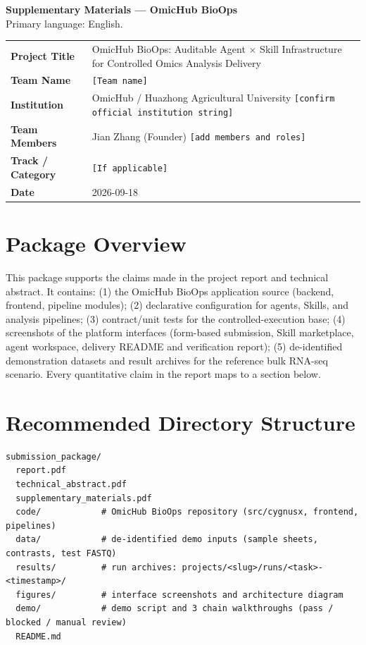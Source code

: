 \documentclass[11pt,a4paper]{article}
\begin{document}
\begin{center}
{\LARGE\bfseries Supplementary Materials --- OmicHub BioOps}\\[0.5em]
{\large Primary language: English.}\\[1.5em]
\end{center}

\begin{tabularx}{\textwidth}{>{\bfseries}p{}X}
\toprule
Project Title & OmicHub BioOps: Auditable Agent $\times$ Skill Infrastructure for Controlled Omics Analysis Delivery\\
Team Name & \texttt{[Team name]}\\
Institution & OmicHub / Huazhong Agricultural University \texttt{[confirm official institution string]}\\
Team Members & Jian Zhang (Founder) \texttt{[add members and roles]}\\
Track / Category & \texttt{[If applicable]}\\
Date & 2026-09-18\\
\bottomrule
\end{tabularx}

\section{Package Overview}

This package supports the claims made in the project report and technical abstract. It contains: (1) the OmicHub BioOps application source (backend, frontend, pipeline modules); (2) declarative configuration for agents, Skills, and analysis pipelines; (3) contract/unit tests for the controlled-execution base; (4) screenshots of the platform interfaces (form-based submission, Skill marketplace, agent workspace, delivery README and verification report); (5) de-identified demonstration datasets and result archives for the reference bulk RNA-seq scenario. Every quantitative claim in the report maps to a section below.

\section{Recommended Directory Structure}
\begin{verbatim}
submission_package/
  report.pdf
  technical_abstract.pdf
  supplementary_materials.pdf
  code/            # OmicHub BioOps repository (src/cygnusx, frontend, pipelines)
  data/            # de-identified demo inputs (sample sheets, contrasts, test FASTQ)
  results/         # run archives: projects/<slug>/runs/<task>-<timestamp>/
  figures/         # interface screenshots and architecture diagram
  demo/            # demo script and 3 chain walkthroughs (pass / blocked / manual review)
  README.md
\end{verbatim}
\end{document}

